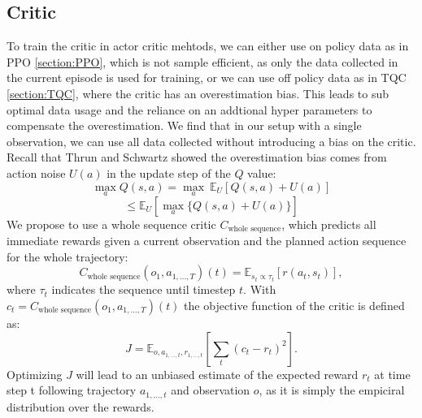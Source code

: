 \subsection{Critic}
\label{sec:AC_Critic}
To train the critic in actor critic mehtods, we can either use on policy data as in PPO \ref{section:PPO}, which is not sample efficient, as only the data collected 
in the current episode is used for training, or we can use off policy data as in TQC \ref{section:TQC}, where the critic has an overestimation bias. This 
leads to sub optimal data usage and the reliance on an addtional hyper parameters to compensate the overestimation. We find that in our setup with a single observation, we can use all data 
collected without introducing a bias on the critic. \\
Recall that Thrun and Schwartz \cite{thrun1993issues} showed the overestimation bias comes from action noise $U(a)$ in the update step of the $Q$ value:
\begin{equation*}
    \max_{a}Q(s,a) = \max_{a}\ \mathbb{E}_U \left[Q(s,a) + U(a)\right]
\end{equation*}
\begin{equation}
    \leq \mathbb{E}_U \left[\max_a \{Q(s,a) + U(a)\}\right]
\end{equation}
We propose to use a whole sequence critic $C_{\text{whole sequence}}$, which predicts all immediate rewards given a current observation 
and the planned action sequence for the whole trajectory:
\begin{equation}
    \label{eq:emp_mean_c}
    C_{\text{whole sequence}}(o_1, a_{1, ..., T})(t) = \mathbb{E}_{s_t \propto \tau_t}\left[r(a_t, s_t)\right],
\end{equation}
where $\tau_t$ indicates the sequence until timestep $t$. 
With $c_t = C_{\text{whole sequence}}(o_1, a_{1, ..., T})(t)$ the objective function of the critic is defined as:
\begin{equation}
    J = \mathbb{E}_{o, a_{1, ..., t}, r_{1, ..., t}}\left[\sum_t(c_t - r_t)^2\right].
\end{equation}
Optimizing $J$ will lead to an unbiased estimate of the expected reward $r_t$ at time step t following trajectory $a_{1, ..., t}$ and observation $o$, as it is simply the empiciral distribution 
over the rewards.\\

